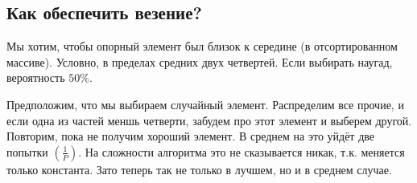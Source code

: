 \subsection*{Как обеспечить везение?}

Мы хотим, чтобы опорный элемент был близок к середине (в отсортированном массиве). Условно, в пределах средних двух четвертей. Если выбирать наугад, вероятность $50\%$.

Предположим, что мы выбираем случайный элемент. Распределим все прочие, и если одна из частей меншь четверти, забудем про этот элемент и выберем другой. Повторим, пока не получим хороший элемент. В среднем на это уйдёт две попытки $\left( \frac1P \right)$. На сложности алгоритма это не сказывается никак, т.к. меняется только константа. Зато теперь так не только в лучшем, но и в среднем случае.

